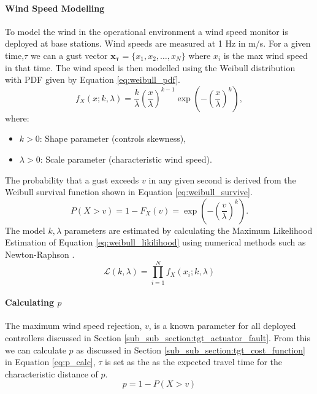 \paragraph{Wind Speed Modelling}
To model the wind in the operational environment a wind speed monitor is deployed at base stations. Wind speeds are measured at 1 Hz in m/s. For a given time,$\tau$ we can a gust vector $\mathbf{x_{\tau}} =  \{x_1, x_2, \dots, x_N\}$ where $x_i$ is the max wind speed in that time. The wind speed is then modelled using the Weibull distribution \cite{weibull1951} with PDF given by Equation \ref{eq:weibull_pdf}.
\begin{equation}\label{eq:weibull_pdf}
    f_X(x; k, \lambda) = \frac{k}{\lambda} \left(\frac{x}{\lambda}\right)^{k-1} \exp\left(-\left(\frac{x}{\lambda}\right)^k\right),
\end{equation}
where:
\begin{itemize}
    \item \( k > 0 \): Shape parameter (controls skewness),
    \item \( \lambda > 0 \): Scale parameter (characteristic wind speed).
\end{itemize}
The probability that a gust exceeds \( v \) in any given second is derived from the Weibull survival function shown in Equation \ref{eq:weibull_survive}.
\begin{equation}\label{eq:weibull_survive}
    P(X > v) = 1 - F_X(v) = \exp\left(-\left(\frac{v}{\lambda}\right)^k\right).
\end{equation}
The model $k, \lambda$ parameters are estimated by calculating the Maximum Likelihood Estimation of Equation \ref{eq:weibull_likilihood} using numerical methods such as Newton-Raphson \cite{rinne2008}.
\begin{equation}\label{eq:weibull_likilihood}
     \mathcal{L}(k, \lambda) = \prod_{i=1}^N f_X(x_i; k, \lambda)
\end{equation}
\paragraph{Calculating $p$}
The maximum wind speed rejection, $v$, is a known parameter for all deployed controllers discussed in Section \ref{sub_sub_section:tgt_actuator_fault}. From this we can calculate $p$ as discussed in Section \ref{sub_sub_section:tgt_cost_function} in Equation \ref{eq:p_calc}, $\tau$ is set as the as the expected travel time for the characteristic distance of $p$.
\begin{equation}\label{eq:p_calc}
    p = 1-P(X>v)
\end{equation}
